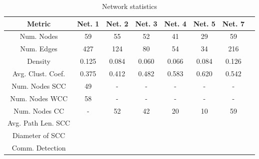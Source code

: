 \begin{table}
    \centering
    \begin{tabular}{|c|c|c|c|c|c|c|c|}
        \hline
        \textbf{Metric} & \textbf{Net. 1} & \textbf{Net. 2} & \textbf{Net. 3} & \textbf{Net. 4} & \textbf{Net. 5} & \textbf{Net. 7} \\
        \hline
        Num. Nodes & 59 & 55 & 52 & 41 & 29 & 59 \\
        \hline
        Num. Edges & 427 & 124 & 80 & 54 & 34 & 216 \\
        \hline
        Density & 0.125 & 0.084 & 0.060 & 0.066 & 0.084 & 0.126 \\
        \hline
        Avg. Clust. Coef. & 0.375 & 0.412 & 0.482 & 0.583 & 0.620 & 0.542 \\
        \hline
        Num. Nodes SCC & 49 & - & - & - & - & - \\
        \hline
        Num. Nodes WCC & 58 & - & - & - & - & - \\
        \hline
        Num. Nodes CC & - & 52 & 42 & 20 & 10 & 59 \\
        \hline
        Avg. Path Len. SCC &  &  &  &  &  &  \\
        \hline
        Diameter of SCC &  &  &  &  &  &  \\
        \hline
        Comm. Detection &  &  &  &  &  &  \\
        \hline
    \end{tabular}
    \caption{Network statistics}
    \label{table:1}
\end{table}
